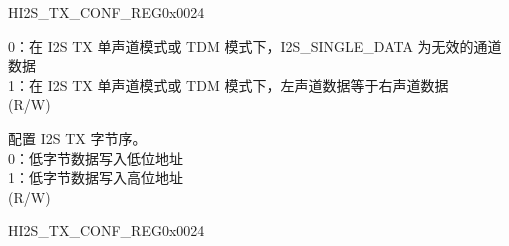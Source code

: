 \begin{register}{H}{I2S\_TX\_CONF\_REG}{0x0024}
\begin{regdesc}
\begin{reglist}
0：在 I2S TX 单声道模式或 TDM 模式下，I2S\_SINGLE\_DATA 为无效的通道数据\\
1：在 I2S TX 单声道模式或 TDM 模式下，左声道数据等于右声道数据\\
(R/W)
\label{fielddesc:I2STXBIGENDIAN}\item [I2S\_TX\_BIG\_ENDIAN] 配置 I2S TX 字节序。\\
0：低字节数据写入低位地址\\
1：低字节数据写入高位地址\\
(R/W)

\item [见下页...]
\end{reglist}\end{regdesc}
\end{register}
\addtocounter{Regfloat}{-1}
\begin{register}{H}{I2S\_TX\_CONF\_REG}{0x0024}
\begin{regdesc}\begin{reglist}
\item [接上页...]


\end{reglist}
\end{regdesc}
\end{register}
